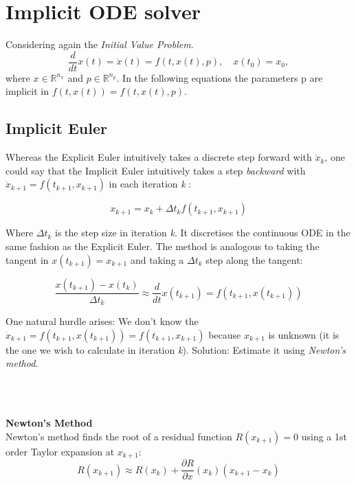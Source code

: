 \section{Implicit ODE solver}
Considering again the \textit{Initial Value Problem}.
$$
\frac{d}{d t} x(t)= \dot{x}(t)=f(t, x(t), p), \quad x\left(t_{0}\right)=x_{0},
$$
where $x \in \mathbb{R}^{n_{x}}$ and $p \in \mathbb{R}^{n_{p}}$. In the following equations the parameters p are implicit in $f(t, x(t)) = f(t, x(t), p)$.

\subsection{Implicit Euler}
Whereas the Explicit Euler intuitively takes a discrete step forward with $\dot{x}_k$, one could say that the Implicit Euler intuitively takes a step \textit{backward} with $\dot{x}_{k+1} = f(t_{k+1}, x_{k+1})$ in each iteration \textit{k} \cite{JrgensenScientificEquationsb}:

\begin{equation}
    x_{k+1}=x_{k}+\Delta t_k f\left(t_{k+1}, x_{k+1}\right)
\end{equation}

Where $\Delta t_k$ is the step size in iteration \textit{k}. It discretises the continuous ODE in the same fashion as the Explicit Euler. The method is analogous to taking the tangent in $x(t_{k+1}) = x_{k+1}$ and taking a $\Delta t_k$ step along the tangent:

\begin{equation}
\frac{x\left(t_{k+1}\right)-x\left(t_{k}\right)}{\Delta t_{k}} \approx \frac{d}{d t} x\left(t_{k+1}\right)=f\left(t_{k+1}, x\left(t_{k+1}\right)\right)
\end{equation}

One natural hurdle arises: We don't know the $\dot{x}_{k+1} = f\left(t_{k+1}, x\left(t_{k+1}\right)\right) = f\left(t_{k+1}, x_{k+1}\right)$ because $x_{k+1}$ is unknown (it is the one we wish to calculate in iteration \textit{k}). Solution: Estimate it using \textit{Newton's method}.

\\\

\textbf{Newton's Method} \\
Newton's method finds the root of a residual function $R(x_{k+1})=0$ using a 1st order Taylor expansion at $x_{k+1}$:
\begin{equation}
    R(x_{k+1}) \approx R(x_k) + \frac{\partial R}{\partial x}\left(x_{k
    }\right)\left(x_{k+1} - x_{k}\right)
\end{equation}

